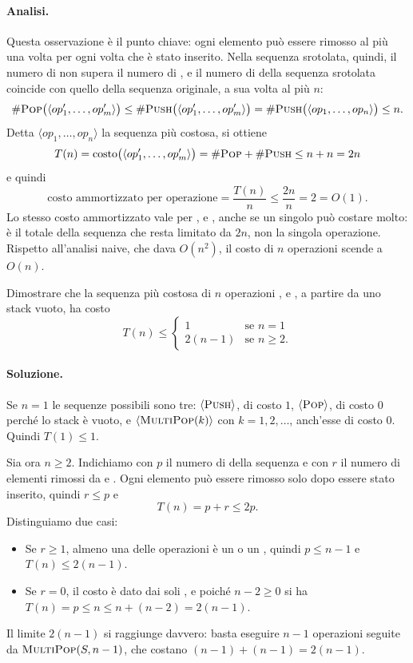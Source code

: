 \paragraph{Analisi.}
Questa osservazione è il punto chiave: ogni elemento può essere rimosso al più una volta per ogni volta che è stato inserito. Nella sequenza srotolata, quindi, il numero di \Pop{} non supera il numero di \Push, e il numero di \Push{} della sequenza srotolata coincide con quello della sequenza originale, a sua volta al più $n$:
\[
\#\textsc{Pop}\big(\langle op'_1,\dots,op'_m\rangle\big) \le \#\textsc{Push}\big(\langle op'_1,\dots,op'_m\rangle\big) = \#\textsc{Push}\big(\langle op_1,\dots,op_n\rangle\big) \le n.
\]
Detta $\langle op_1,\dots,op_n\rangle$ la sequenza più costosa, si ottiene
\[
T(n) = \text{costo}\big(\langle op'_1,\dots,op'_m\rangle\big) = \#\textsc{Pop} + \#\textsc{Push} \le n + n = 2n
\]
e quindi
\[
\text{costo ammortizzato per operazione} = \frac{T(n)}{n} \le \frac{2n}{n} = 2 = O(1).
\]
Lo stesso costo ammortizzato vale per \Push, \Pop{} e \MultiPop{}, anche se un singolo \MultiPop{} può costare molto: è il totale della sequenza che resta limitato da $2n$, non la singola operazione. Rispetto all'analisi naive, che dava $O(n^2)$, il costo di $n$ operazioni scende a $O(n)$.

\begin{esercizio}
Dimostrare che la sequenza più costosa di $n$ operazioni \Push, \Pop{} e \MultiPop, a partire da uno stack vuoto, ha costo
\[
T(n) \le \begin{cases} 1 & \text{se } n = 1 \\ 2(n-1) & \text{se } n \ge 2. \end{cases}
\]
\end{esercizio}

\paragraph{Soluzione.}
Se $n=1$ le sequenze possibili sono tre: $\langle\textsc{Push}\rangle$, di costo $1$, $\langle\textsc{Pop}\rangle$, di costo $0$ perché lo stack è vuoto, e $\langle\textsc{MultiPop}(k)\rangle$ con $k = 1,2,\dots$, anch'esse di costo $0$. Quindi $T(1) \le 1$.

Sia ora $n \ge 2$. Indichiamo con $p$ il numero di \Push{} della sequenza e con $r$ il numero di elementi rimossi da \Pop{} e \MultiPop. Ogni elemento può essere rimosso solo dopo essere stato inserito, quindi $r \le p$ e
\[
T(n) = p + r \le 2p.
\]
Distinguiamo due casi:
\begin{itemize}
    \item Se $r \ge 1$, almeno una delle operazioni è un \Pop{} o un \MultiPop, quindi $p \le n-1$ e $T(n) \le 2(n-1)$.
    \item Se $r = 0$, il costo è dato dai soli \Push, e poiché $n - 2 \ge 0$ si ha $T(n) = p \le n \le n + (n-2) = 2(n-1)$.
\end{itemize}
Il limite $2(n-1)$ si raggiunge davvero: basta eseguire $n-1$ operazioni \Push{} seguite da $\textsc{MultiPop}(S,n-1)$, che costano $(n-1)+(n-1)=2(n-1)$.

